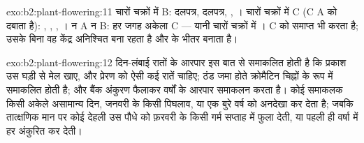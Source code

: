 \begin{solution}{exo:b2:plant-flowering:11}
चारों चक्रों में B: दलपत्र, दलपत्र, , । चारों चक्रों में C (C
A को दबाता है): , , , । न A न B: हर जगह अकेला C
--- यानी चारों चक्रों में । C  को समाप्त भी करता
है; उसके बिना वह केंद्र अनिश्चित बना रहता है और 
के भीतर  बनाता है।
\end{solution}

\begin{solution}{exo:b2:plant-flowering:12}
दिन-लंबाई रातों के आरपार इस बात से समाकलित होती है कि प्रकाश उस घड़ी से
मेल खाए, और प्रेरण को ऐसी कई रातें चाहिए; ठंड जमा होते क्रोमैटिन चिह्नों
के रूप में समाकलित होती है; और  बैंक
अंकुरण फैलाकर वर्षों के आरपार समाकलन करता है। कोई समाकलक
किसी अकेले असामान्य दिन, जनवरी के किसी पिघलाव, या एक बुरे वर्ष को
अनदेखा कर देता है; जबकि तात्क्षणिक मान पर कोई देहली उस पौधे को फ़रवरी के
किसी गर्म सप्ताह में फुला देती, या पहली ही वर्षा में हर  अंकुरित कर देती।
\end{solution}

